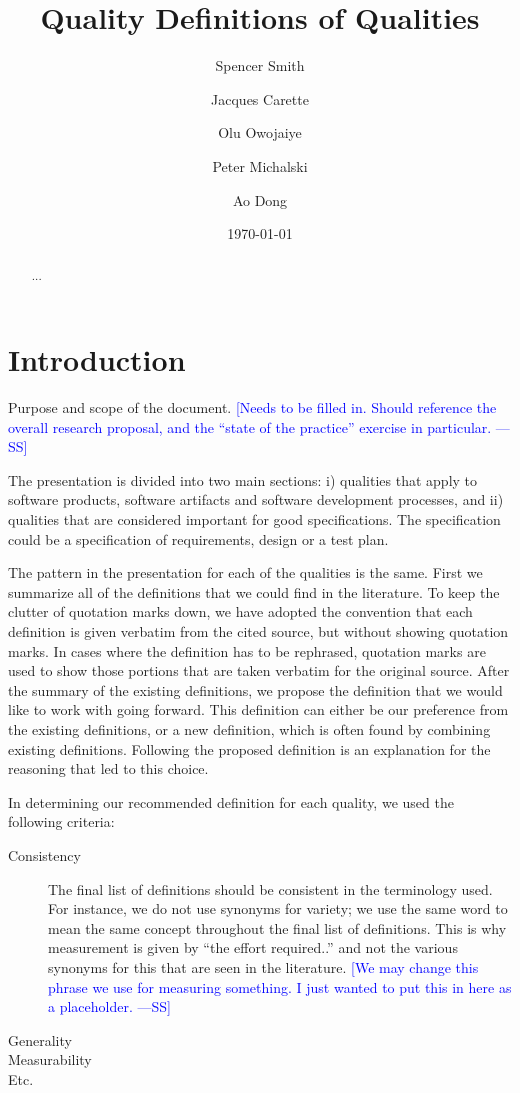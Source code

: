 \documentclass[letterpaper,cleveref]{lipics-v2019}
\title{Quality Definitions of Qualities}
\author{Spencer Smith}{McMaster University, Canada}{smiths@mcmaster.ca}{}{}
\author{Jacques Carette}{McMaster University, Canada}{carette@mcmaster.ca}{}{}
\author{Olu Owojaiye}{McMaster University, Canada}{owojaiyo@mcmaster.ca}{}{}
\author{Peter Michalski}{McMaster University, Canada}{michap@mcmaster.ca}{}{}
\author{Ao Dong}{McMaster University, Canada}{}{}{}
\date{\today}
\newcommand{\authornote}[3]{\textcolor{#1}{[#3 ---#2]}}
\newcommand{\authornote}[3]{}
\newcommand{\wss}[1]{\authornote{blue}{SS}{#1}} %
\theoremstyle{definition}
\begin{document}
\maketitle

\begin{abstract}
	...
\end{abstract}

\tableofcontents

\section{Introduction} \label{SecIntroduction}

Purpose and scope of the document.  \wss{Needs to be filled in.  Should
	reference the overall research proposal, and the ``state of the practice''
	exercise in particular.}

The presentation is divided into two main sections: i) qualities that apply to
software products, software artifacts and software development processes, and
ii) qualities that are considered important for good specifications.  The
specification could be a specification of requirements, design or a test plan.

The pattern in the presentation for each of the qualities is the same.  First we
summarize all of the definitions that we could find in the literature.  To keep
the clutter of quotation marks down, we have adopted the convention that each
definition is given verbatim from the cited source, but without showing
quotation marks.  In cases where the definition has to be rephrased, quotation
marks are used to show those portions that are taken verbatim for the original
source.  After the summary of the existing definitions, we propose the
definition that we would like to work with going forward.  This definition can
either be our preference from the existing definitions, or a new definition,
which is often found by combining existing definitions.  Following the proposed
definition is an explanation for the reasoning that led to this choice.

In determining our recommended definition for each quality, we used the
following criteria:

\begin{description}
\item[Consistency] The final list of definitions should be consistent in the
  terminology used.  For instance, we do not use synonyms for variety; we use
  the same word to mean the same concept throughout the final list of
  definitions.  This is why measurement is given by ``the effort required..''
  and not the various synonyms for this that are seen in the literature. \wss{We
    may change this phrase we use for measuring something.  I just wanted to put
    this in here as a placeholder.}
\item[Generality]
\item[Measurability]
\item[Etc.]
\end{description}
\end{document}
